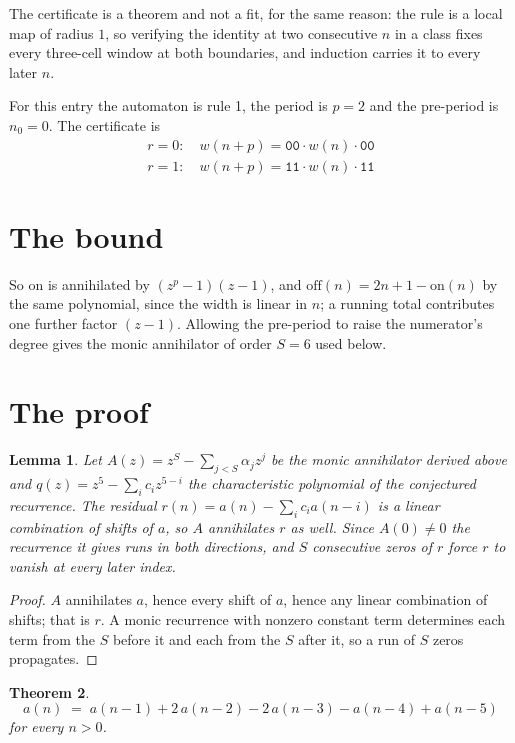 \documentclass[11pt,a4paper]{article}
\theoremstyle{plain}
\newtheorem{theorem}{Theorem}
\newtheorem{lemma}[theorem]{Lemma}
\theoremstyle{definition}
\begin{document}
The certificate is a theorem and not a fit, for the same reason: the rule is a local map of
radius $1$, so verifying the identity at two consecutive $n$ in a class fixes every three-cell
window at both boundaries, and induction carries it to every later $n$.

For this entry the automaton is rule 1, the period is $p=2$ and the pre-period is $n_0=0$.
The certificate is
\begin{gather*}
r=0:\quad w(n+p) = \texttt{00} \cdot w(n) \cdot \texttt{00} \\
r=1:\quad w(n+p) = \texttt{11} \cdot w(n) \cdot \texttt{11}
\end{gather*}

\section{The bound}

So
$\mathrm{on}$ is annihilated by $(z^p-1)(z-1)$, and $\mathrm{off}(n)=2n+1-\mathrm{on}(n)$ by
the same polynomial, since the width is linear in $n$; a running total contributes one further
factor $(z-1)$. Allowing the pre-period to raise the numerator's degree gives the monic
annihilator of order $S=6$ used below.

\section{The proof}

\begin{lemma}\label{lem:crit}
Let $A(z)=z^S-\sum_{j<S}\alpha_jz^{j}$ be the monic annihilator derived above and
$q(z)=z^{5}-\sum_ic_iz^{5-i}$ the characteristic polynomial of the conjectured
recurrence. The residual $r(n)=a(n)-\sum_ic_ia(n-i)$ is a linear combination of shifts of $a$,
so $A$ annihilates $r$ as well. Since $A(0)\ne0$ the recurrence it gives runs in both
directions, and $S$ consecutive zeros of $r$ force $r$ to vanish at every later index.
\end{lemma}

\begin{proof}
$A$ annihilates $a$, hence every shift of $a$, hence any linear combination of shifts; that is
$r$. A monic recurrence with nonzero constant term determines each term from the $S$ before it
and each from the $S$ after it, so a run of $S$ zeros propagates.
\end{proof}

\begin{theorem}
\[
a(n)\;=\;a(n-1) + 2\,a(n-2) - 2\,a(n-3) - a(n-4) + a(n-5)
\]
for every $n>0$.
\end{theorem}
\end{document}
